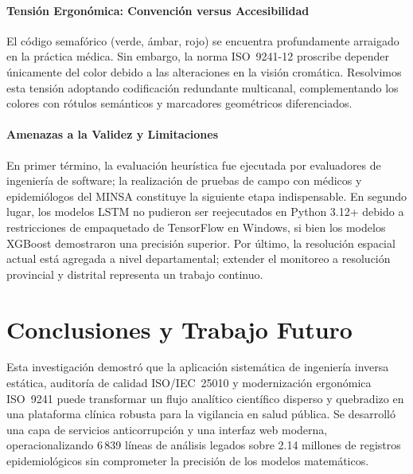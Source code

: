 \documentclass[conference]{IEEEtran}
\begin{document}
\paragraph{Tensi\'on Ergon\'omica: Convenci\'on versus Accesibilidad}
El c\'odigo semaf\'orico (verde, \'ambar, rojo) se encuentra profundamente arraigado en la pr\'actica m\'edica. Sin embargo, la norma ISO~9241-12 proscribe depender \'unicamente del color debido a las alteraciones en la visi\'on crom\'atica. Resolvimos esta tensi\'on adoptando codificaci\'on redundante multicanal, complementando los colores con r\'otulos sem\'anticos y marcadores geom\'etricos diferenciados.

\paragraph{Amenazas a la Validez y Limitaciones}
En primer t\'ermino, la evaluaci\'on heur\'istica fue ejecutada por evaluadores de ingenier\'ia de software; la realizaci\'on de pruebas de campo con m\'edicos y epidemi\'ologos del MINSA constituye la siguiente etapa indispensable. En segundo lugar, los modelos LSTM no pudieron ser reejecutados en Python 3.12+ debido a restricciones de empaquetado de TensorFlow en Windows, si bien los modelos XGBoost demostraron una precisi\'on superior. Por \'ultimo, la resoluci\'on espacial actual est\'a agregada a nivel departamental; extender el monitoreo a resoluci\'on provincial y distrital representa un trabajo continuo.

\section{Conclusiones y Trabajo Futuro}
\label{sec:conclusions}

Esta investigaci\'on demostr\'o que la aplicaci\'on sistem\'atica de ingenier\'ia inversa est\'atica, auditor\'ia de calidad ISO/IEC~25010 y modernizaci\'on ergon\'omica ISO~9241 puede transformar un flujo anal\'itico cient\'ifico disperso y quebradizo en una plataforma cl\'inica robusta para la vigilancia en salud p\'ublica. Se desarroll\'o una capa de servicios anticorrupci\'on y una interfaz web moderna, operacionalizando 6\,839 l\'ineas de an\'alisis legados sobre 2.14 millones de registros epidemiol\'ogicos sin comprometer la precisi\'on de los modelos matem\'aticos.
\end{document}
